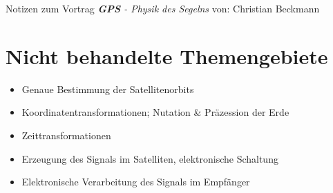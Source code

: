 
\newcommand{\ch}{$\checkmark$}

    {\huge Notizen zum Vortrag \textit{\textbf{GPS} - Physik des Segelns}}
    von: Christian Beckmann
    \tableofcontents
    
    \newpage
    
    
    
    
    
    

    \section{Nicht behandelte Themengebiete}
    \begin{itemize}
        \item Genaue Bestimmung der Satellitenorbits
        \item Koordinatentransformationen; Nutation \& Präzession der Erde
        \item Zeittransformationen
        \item Erzeugung des Signals im Satelliten, elektronische Schaltung
        \item Elektronische Verarbeitung des Signals im Empfänger
    \end{itemize}
    \nocite{*}
    \printbibliography

